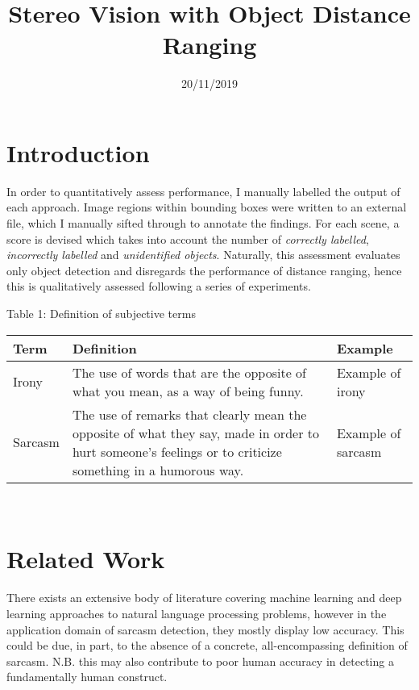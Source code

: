 \documentclass[12pt,a4paper]{article}
\title{Stereo Vision with Object Distance Ranging}
\author{} %
\date{20/11/2019}
\begin{document}
\maketitle

\noindent \section{Introduction}


In order to quantitatively assess performance, I manually labelled the output of each approach. Image regions within bounding boxes were written to an external file, which I manually sifted through to annotate the findings. For each scene, a score is devised which takes into account the number of \textit{correctly labelled}, \textit{incorrectly labelled} and \textit{unidentified objects}. Naturally, this assessment evaluates only object detection and disregards the performance of distance ranging, hence this is qualitatively assessed following a series of experiments.

\begin{center}
	Table 1: Definition of subjective terms
\end{center}
\begin{tabular}{p{3cm}p{8cm}p{5cm}}
	\hline
	\textbf{Term} & \textbf{Definition} & \textbf{Example}\\
	\hline\hline
	Irony & The use of words that are the opposite of what you mean, as a way of being funny. \cite{cambridgeirony2019} &  Example of irony\\
	\hline
	Sarcasm & The use of remarks that clearly mean the opposite of what they say, made in order to hurt someone's feelings or to criticize something in a humorous way. \cite{cambridgesarcasm2019} &  Example of sarcasm\\
	\hline
\end{tabular}\\



\section{Related Work}
\noindent There exists an extensive body of literature covering machine learning and deep learning approaches to natural language processing problems, however in the application domain of sarcasm detection, they mostly display low accuracy. This could be due, in part, to the absence of a concrete, all-encompassing definition of sarcasm. N.B. this may also contribute to poor human accuracy in detecting a fundamentally human construct. \\



\end{document}
